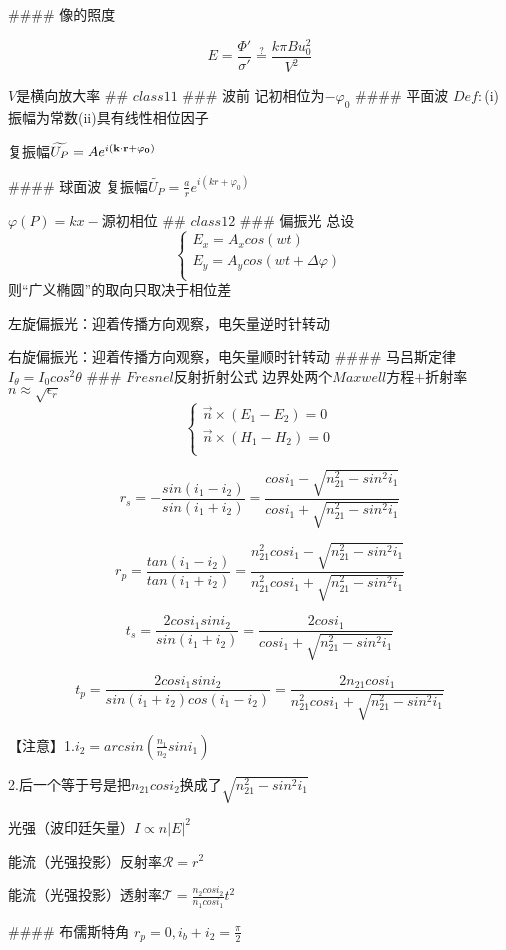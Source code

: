 \documentclass[12pt]{ctexart}
\begin{document}
#### 像的照度

$$E=\frac{\Phi'}{\sigma'}\stackrel{?}{=}\frac{k\pi Bu_0^2}{V^2}$$

$V$是横向放大率
## $class11$
### 波前
记初相位为$-\varphi_0$
#### 平面波
$Def:$(i)振幅为常数(ii)具有线性相位因子

复振幅$\widetilde{U_P}=Ae^{i(\bf k\cdot \bf r+\varphi_0)}$

#### 球面波
复振幅$\widetilde{U_P}=\frac{a}{r}e^{i(kr+\varphi_0)}$

$\varphi(P)=kx-$源初相位
## $class12$
### 偏振光
总设
$$\begin{cases}
E_x=A_xcos(wt)\\
E_y=A_ycos(wt+\Delta\varphi)\\
\end{cases}$$
则“广义椭圆”的取向只取决于相位差

左旋偏振光：迎着传播方向观察，电矢量逆时针转动

右旋偏振光：迎着传播方向观察，电矢量顺时针转动
#### 马吕斯定律
$I_\theta=I_0cos^2\theta$
### $Fresnel$反射折射公式
边界处两个$Maxwell$方程$+$折射率$n\approx\sqrt{\epsilon_r}$
$$\begin{cases}
\vec{n}\times(E_1-E_2)=0\\
\vec{n}\times(H_1-H_2)=0\\
\end{cases}$$

$$r_s=-\frac{sin(i_1-i_2)}{sin(i_1+i_2)}=\frac{cosi_1-\sqrt{n_{21}^2-sin^2i_1}}{cosi_1+\sqrt{n_{21}^2-sin^2i_1}}$$

$$r_p=\frac{tan(i_1-i_2)}{tan(i_1+i_2)}=\frac{n_{21}^2cosi_1-\sqrt{n_{21}^2-sin^2i_1}}{n_{21}^2cosi_1+\sqrt{n_{21}^2-sin^2i_1}}$$

$$t_s=\frac{2cosi_1sini_2}{sin(i_1+i_2)}=\frac{2cosi_1}{cosi_1+\sqrt{n_{21}^2-sin^2i_1}}$$

$$t_p=\frac{2cosi_1sini_2}{sin(i_1+i_2)cos(i_1-i_2)}=\frac{2n_{21}cosi_1}{n_{21}^2cosi_1+\sqrt{n_{21}^2-sin^2i_1}}$$

【注意】1.$i_2=arcsin(\frac{n_1}{n_2}sini_1)$

2.后一个等于号是把$n_{21}cosi_2$换成了$\sqrt{n_{21}^2-sin^2i_1}$

光强（波印廷矢量）$I\propto n|E|^2$

能流（光强投影）反射率$\mathscr{R}=r^2$

能流（光强投影）透射率$\mathscr{T}=\frac{n_2cosi_2}{n_1cosi_1}t^2$

#### 布儒斯特角
$r_p=0,i_b+i_2=\frac{\pi}{2}$
\end{document}
